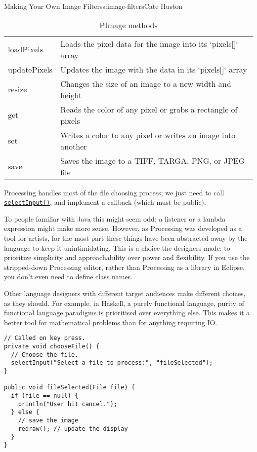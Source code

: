 \begin{aosachapter}{Making Your Own Image Filters}{s:image-filters}{Cate Huston}
\begin{table}
\centering
{\footnotesize
{}
\begin{tabular}{ll}
\hline
loadPixels & Loads the pixel data for the image into its `pixels[]` array \\
updatePixels & Updates the image with the data in its `pixels[]` array \\
resize & Changes the size of an image to a new width and height \\
get & Reads the color of any pixel or grabs a rectangle of pixels \\
set & Writes a color to any pixel or writes an image into another \\
save & Saves the image to a TIFF, TARGA, PNG, or JPEG file \\
\hline
\end{tabular}
}
\caption{PImage methods}
\label{500l.imagefilters.pimagemethods}
\end{table}

\label{file-chooser}

Processing handles most of the file choosing process; we just need to
call
\href{http://www.processing.org/reference/selectInput_.html}{\texttt{selectInput()}},
and implement a callback (which must be public).

To people familiar with Java this might seem odd; a listener or a lambda
expression might make more sense. However, as Processing was developed
as a tool for artists, for the most part these things have been
abstracted away by the language to keep it unintimidating. This is a
choice the designers made: to prioritize simplicity and approachability
over power and flexibility. If you use the stripped-down Processing
editor, rather than Processing as a library in Eclipse, you don't even
need to define class names.

Other language designers with different target audiences make different
choices, as they should. For example, in Haskell, a purely functional
language, purity of functional language paradigms is prioritised over
everything else. This makes it a better tool for mathematical problems
than for anything requiring IO.

\begin{verbatim}
// Called on key press.
private void chooseFile() {
  // Choose the file.
  selectInput("Select a file to process:", "fileSelected");
}

public void fileSelected(File file) {
  if (file == null) {
    println("User hit cancel.");
  } else {
    // save the image
    redraw(); // update the display
  }
}
\end{verbatim}


\end{aosachapter}
